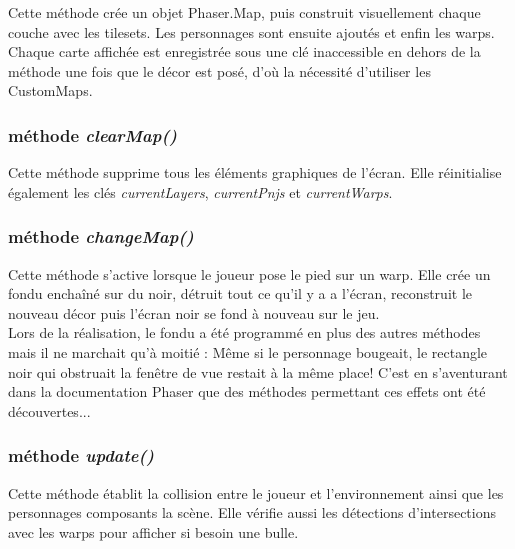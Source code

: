 \documentclass[11pt]{article}
\begin{document}
\begin{appendices}
Cette méthode crée un objet Phaser.Map, puis construit visuellement chaque couche avec les tilesets. Les personnages sont ensuite ajoutés et enfin les warps. Chaque carte affichée est enregistrée sous une clé inaccessible en dehors de la méthode une fois que le décor est posé, d'où la nécessité d'utiliser les CustomMaps.
\subsubsection{méthode \textit{clearMap()}}
Cette méthode supprime tous les éléments graphiques de l'écran. Elle réinitialise également les clés \textit{currentLayers}, \textit{currentPnjs} et \textit{currentWarps}.
\subsubsection{méthode \textit{changeMap()}}
Cette méthode s'active lorsque le joueur pose le pied sur un warp. 
Elle crée un fondu enchaîné sur du noir, détruit tout ce qu'il y a a l'écran, reconstruit le nouveau décor puis l'écran noir se fond à nouveau sur le jeu.\\

Lors de la réalisation, le fondu a été programmé en plus des autres méthodes mais il ne marchait qu'à moitié : Même si le personnage bougeait, le rectangle noir qui obstruait la fenêtre de vue restait à la même place! C'est en s'aventurant dans la documentation Phaser que des méthodes permettant ces effets ont été découvertes...
\subsubsection{méthode \textit{update()}}
Cette méthode établit la collision entre le joueur et l'environnement ainsi que les personnages composants la scène. Elle vérifie aussi les détections d'intersections avec les warps pour afficher si besoin une bulle.\\


\end{appendices}
\end{document}
